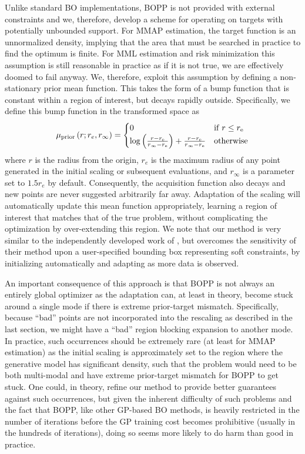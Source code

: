 Unlike standard BO implementations, BOPP is not provided with external constraints and we, therefore, 
develop a scheme for operating on targets with potentially unbounded support.  For MMAP estimation,
the target function is an unnormalized density, implying that the area that must 
be searched in practice to find the optimum is finite.  For MML estimation and risk minimization this
assumption is still reasonable in practice as if it is not true, we are effectively doomed to fail anyway.
We, therefore, exploit this assumption by defining a non-stationary prior mean function.  
This takes the form of a bump function that is constant within a region of interest, but decays rapidly 
outside.  Specifically, we define this bump function in the transformed space as
\begin{align}
\label{eq:BUMP}
\mu_{\mathrm{prior}}\left(r;r_e,r_{\mathrm{\infty}}\right) = \begin{cases} 0  \hfill & \mathrm{if} \; r \leq r_{\mathrm{e}} \\ 
\log \left(\frac{r-r_{\mathrm{e}}}{r_{\mathrm{\infty}}-r_{\mathrm{e}}}\right)+\frac{r-r_{\mathrm{e}}}{r_{\mathrm{\infty}}-r_{\mathrm{e}}} & \mathrm{otherwise} \end{cases}
\end{align}
where $r$ is the radius from the origin, $r_e$ is the maximum radius of any point generated 
in the initial scaling or subsequent evaluations, and $r_{\mathrm{\infty}}$ is a parameter 
set to $1.5 r_{e}$ by default.  Consequently, the acquisition function also decays and new points 
are never suggested arbitrarily far away.  Adaptation of the scaling will automatically update this 
mean function appropriately, learning a region of interest that matches that of the true problem, 
without complicating the optimization by over-extending this region.  We note that our method 
is very similar to the independently developed work of \cite{shahriari2016unbounded}, but overcomes the 
sensitivity of their method upon a user-specified bounding box representing soft constraints, 
by initializing automatically and adapting as more data is observed.

An important consequence of this approach is that BOPP is not always an entirely
global optimizer as the adaptation can, at least in theory, become stuck around a single mode if
there is extreme prior-target mismatch.  Specifically, because ``bad'' points 
are not incorporated into the rescaling as described in the last
section, we might have a ``bad'' region blocking expansion to another mode.
In practice, such occurrences should be extremely rare (at least for MMAP estimation) as the
initial scaling is approximately set to the region where the generative model has significant density, such that
the problem would need to be both multi-modal and have extreme prior-target mismatch for BOPP to
get stuck.  One could, in theory, refine our method to provide better guarantees against such occurrences,
but given the inherent difficulty of such problems and the fact that BOPP, like other GP-based BO methods,
is heavily restricted in the number of iterations before the GP training cost becomes
prohibitive (usually in the hundreds of iterations), doing so seems more likely to do harm than good in practice.